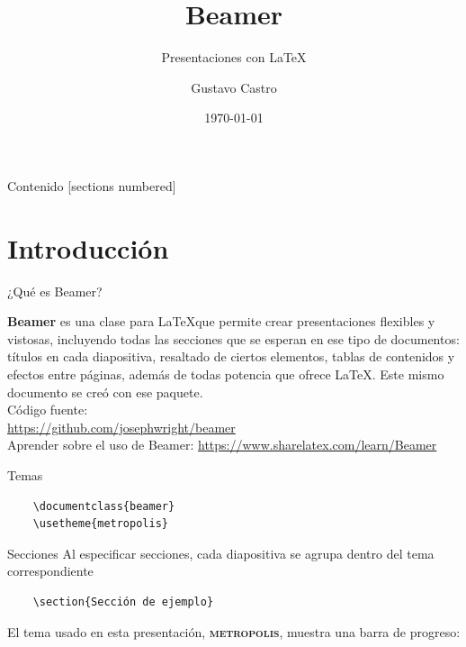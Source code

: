\documentclass[10pt]{beamer}
\title{Beamer}
\subtitle{Presentaciones con \LaTeX}
\date{\today}
\author{Gustavo Castro}
\newcommand{\themename}{\textbf{\textsc{metropolis}}\xspace}
\begin{document}
\maketitle

\begin{frame}{Contenido}
    [sections numbered]
    \tableofcontents[hideallsubsections]
\end{frame}

\section{Introducción}

\begin{frame}[fragile]{¿Qué es Beamer?}

\textbf{Beamer} es una clase para \LaTeX que permite crear presentaciones flexibles y vistosas, incluyendo todas las secciones que se esperan en ese tipo de documentos: títulos en cada diapositiva, resaltado de ciertos elementos, tablas de contenidos y efectos entre páginas, además de todas potencia que ofrece \LaTeX. Este mismo documento se creó con ese paquete.
\\ \vspace{0.3in}
Código fuente: \\
\url{https://github.com/josephwright/beamer}
\\ \vspace{0.3in}Aprender sobre el uso de Beamer: \url{https://www.sharelatex.com/learn/Beamer}
\end{frame}

\begin{frame}[fragile]{Temas}
\begin{verbatim}
    \documentclass{beamer}
    \usetheme{metropolis}
\end{verbatim}
\end{frame}
\begin{frame}[fragile]{Secciones}
Al especificar secciones, cada diapositiva se agrupa dentro del tema correspondiente

\begin{verbatim}
    \section{Sección de ejemplo}
\end{verbatim}

El tema usado en esta presentación, \themename, muestra una barra de progreso:
\end{frame}
\end{document}
